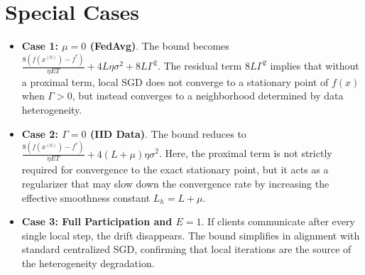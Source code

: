 \documentclass{article}
\begin{document}
\section*{Special Cases}
\begin{itemize}
    \item \textbf{Case 1: $\mu = 0$ (FedAvg)}. The bound becomes $\frac{8(f(x^{(0)}) - f^*)}{\eta E T} + 4L \eta \sigma^2 + 8L \Gamma^2$. The residual term $8L\Gamma^2$ implies that without a proximal term, local SGD does not converge to a stationary point of $f(x)$ when $\Gamma > 0$, but instead converges to a neighborhood determined by data heterogeneity.
    \item \textbf{Case 2: $\Gamma = 0$ (IID Data)}. The bound reduces to $\frac{8(f(x^{(0)}) - f^*)}{\eta E T} + 4(L+\mu) \eta \sigma^2$. Here, the proximal term is not strictly required for convergence to the exact stationary point, but it acts as a regularizer that may slow down the convergence rate by increasing the effective smoothness constant $L_h = L + \mu$.
    \item \textbf{Case 3: Full Participation and $E=1$}. If clients communicate after every single local step, the drift disappears. The bound simplifies in alignment with standard centralized SGD, confirming that local iterations are the source of the heterogeneity degradation.
\end{itemize}
\end{document}
